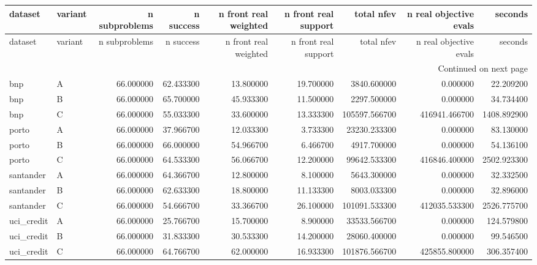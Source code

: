 \begin{landscape}
\begin{center}\label{tab:s7nbi}\end{center}
\begingroup\tiny\setlength{\tabcolsep}{2.5pt}
\begin{longtable}{llrrrrrrr}
\toprule
dataset & variant & n subproblems & n success & n front real weighted & n front real support & total nfev & n real objective evals & seconds \\
\midrule
\endfirsthead
\toprule
dataset & variant & n subproblems & n success & n front real weighted & n front real support & total nfev & n real objective evals & seconds \\
\midrule
\endhead
\midrule
\multicolumn{9}{r}{Continued on next page} \\
\midrule
\endfoot
\bottomrule
\endlastfoot
bnp & A & 66.000000 & 62.433300 & 13.800000 & 19.700000 & 3840.600000 & 0.000000 & 22.209200 \\
bnp & B & 66.000000 & 65.700000 & 45.933300 & 11.500000 & 2297.500000 & 0.000000 & 34.734400 \\
bnp & C & 66.000000 & 55.033300 & 33.600000 & 13.333300 & 105597.566700 & 416941.466700 & 1408.892900 \\
porto & A & 66.000000 & 37.966700 & 12.033300 & 3.733300 & 23230.233300 & 0.000000 & 83.130000 \\
porto & B & 66.000000 & 66.000000 & 54.966700 & 6.466700 & 4917.700000 & 0.000000 & 54.136100 \\
porto & C & 66.000000 & 64.533300 & 56.066700 & 12.200000 & 99642.533300 & 416846.400000 & 2502.923300 \\
santander & A & 66.000000 & 64.366700 & 12.800000 & 8.100000 & 5643.300000 & 0.000000 & 32.332500 \\
santander & B & 66.000000 & 62.633300 & 18.800000 & 11.133300 & 8003.033300 & 0.000000 & 32.896000 \\
santander & C & 66.000000 & 54.666700 & 33.366700 & 26.100000 & 101091.533300 & 412035.533300 & 2526.775700 \\
uci\_credit & A & 66.000000 & 25.766700 & 15.700000 & 8.900000 & 33533.566700 & 0.000000 & 124.579800 \\
uci\_credit & B & 66.000000 & 31.833300 & 30.533300 & 14.200000 & 28060.400000 & 0.000000 & 99.546500 \\
uci\_credit & C & 66.000000 & 64.766700 & 62.000000 & 16.933300 & 101876.566700 & 425855.800000 & 306.357400 \\
\end{longtable}\endgroup\addtocounter{table}{-1}

\end{landscape}
